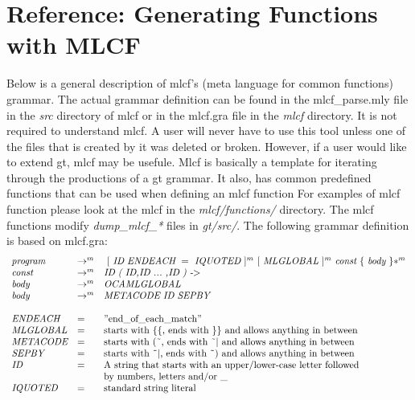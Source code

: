 \section{Reference: Generating Functions with MLCF}

Below is a general description of mlcf's (meta language for common functions) grammar. The actual grammar definition can be
found in the mlcf\_parse.mly file in the \textit{src} directory of mlcf or in the mlcf.gra file in the \textit{mlcf} directory. 
It is not required to understand mlcf. A user will never have to use this tool unless one of the files that is created 
by it was deleted or broken. However, if a user would like to extend gt, mlcf may be usefule. Mlcf is basically a template for iterating
through the productions of a gt grammar. It also, has common predefined functions that can be used when defining an mlcf function 
For examples of mlcf function please look at the mlcf in the \textit{mlcf/functions/} directory. The mlcf functions modify 
\textit{dump\_mlcf\_*} files in \textit{gt/src/}. The following grammar definition is based on mlcf.gra:\\
\[
\begin{array}{lll}
\textit{program} & \to^m & \ [\ \textit{ID}\ \textit{ENDEACH}\ =\ \textit{IQUOTED}\ ]^m\ [\ \textit{MLGLOBAL}\ ]^m\ \textit{const}\ \{\ \textit{body}\ \}*^m \\


\textit{const} & \to^m & \textit{ID}\ \textit{(}\ \textit{ID} \textit{,}  \textit{ID}\ \textit{...}\ \textit{,}  \textit{ID}\ \textit{)}\ \textit{-$>$} \\ 
\textit{body} & \to^m & \textit{OCAMLGLOBAL} \\
\textit{body} & \to^m & \textit{METACODE}\ \textit{ID} \ \textit{SEPBY} \\ \\

\textit{ENDEACH} & = & "\textnormal{end\_of\_each\_match}" \\

\textit{MLGLOBAL} & = & \textnormal{starts with \{\{, ends with \}\} and allows anything in between } \\
\textit{METACODE} & = & \textnormal{starts with (\~{}, ends with \~{}$|$ and allows anything in between } \\
\textit{SEPBY} & = & \textnormal{starts with \~{}$|$, ends with \~{}) and allows anything in between } \\
\textit{ID} & = & \textnormal{A string that starts with an upper/lower-case letter followed } \\
\ & \ & \textnormal{by numbers, letters and/or \_} \\
\textit{IQUOTED} & = & \textnormal{standard string literal} 
\end{array}
\]

